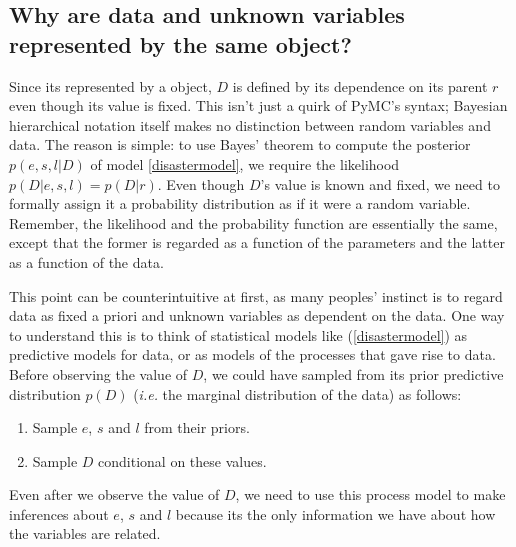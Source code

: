 \subsection{Why are data and unknown variables represented by the same
object?}
Since its represented by a  object, $D$ is defined by its dependence on its parent $r$ even though its value is fixed. This isn't just a quirk of PyMC's syntax; Bayesian hierarchical notation itself makes no distinction between random variables and data. The reason is simple: to use Bayes' theorem to compute the posterior $p(e,s,l|D)$ of model \ref{disastermodel}, we require the likelihood $p(D|e,s,l)=p(D|r)$. Even though $D$'s value is known and fixed, we need to formally assign it a probability distribution as if it were a random variable. Remember, the likelihood and the probability function are essentially the same, except that the former is regarded as a function of the parameters and the latter as a function of the data. 

This point can be counterintuitive at first, as many peoples' instinct is to regard data as fixed a priori and unknown variables as dependent on the data. One way to understand this is to think of statistical models like (\ref{disastermodel}) as predictive models for data, or as models of the processes that gave rise to data. Before observing the value of $D$, we could have sampled from its prior predictive distribution $p(D)$ (\emph{i.e.} the marginal distribution of the data) as follows:
\begin{enumerate}
    \item Sample $e$, $s$ and $l$ from their priors.
    \item Sample $D$ conditional on these values.
\end{enumerate}
Even after we observe the value of $D$, we need to use this process model to make inferences about $e$, $s$ and $l$ because its the only information we have about how the variables are related.

% 


